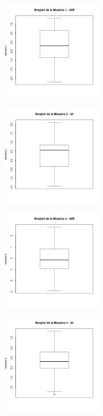 \documentclass[a4paper,10pt,twocolumn]{report}
\begin{document}
	\begin{figure}[H]
		\centering
		\includegraphics[width=0.45\textwidth]{img/ex2/BoxPlots/BoxPlots1.jpeg}
		\label{box:2.1}
	\end{figure}

	\begin{figure}[H]
		\centering
		\includegraphics[width=0.45\textwidth]{img/ex2/BoxPlots/BoxPlots2.jpeg}
		\label{box:2.2}
	\end{figure}


	\begin{figure}[H]
		\centering
		\includegraphics[width=0.45\textwidth]{img/ex2/BoxPlots/BoxPlots3.jpeg}
		\label{box:2.3}
	\end{figure}


	\begin{figure}[H]
		\centering
		\includegraphics[width=0.45\textwidth]{img/ex2/BoxPlots/BoxPlots4.jpeg}
		\label{box:2.4}
	\end{figure}
\end{document}

